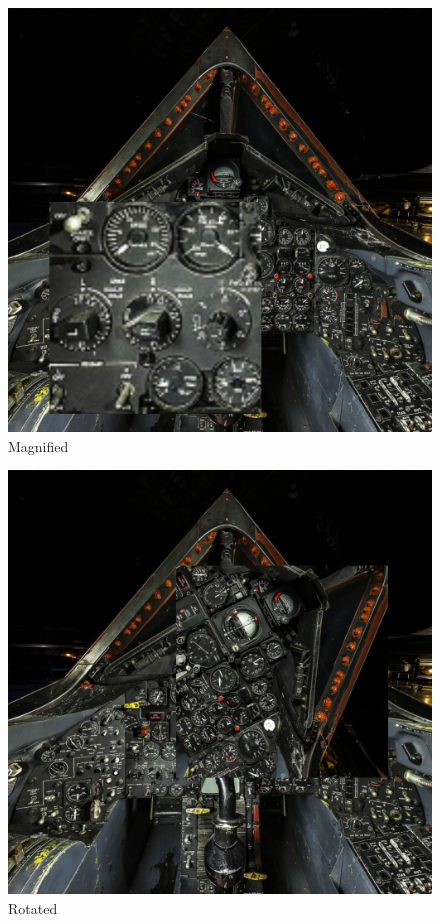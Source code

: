 \documentclass[12pt,letterpaper]{article}
\begin{document}
\begin{figure}[!h]
    \centering
    \includegraphics[width=1.0\textwidth]{img/mag.png}
    \caption{Magnified}
\end{figure}

\begin{figure}[!h]
    \centering
    \includegraphics[width=1.0\textwidth]{img/rot.png}
    \caption{Rotated}
\end{figure}
\end{document}
